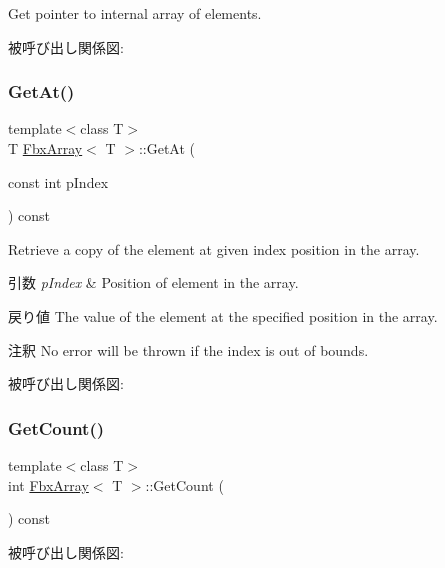 Get pointer to internal array of elements. 

被呼び出し関係図\+:
\mbox{\label{class_fbx_array_a868a1b5f4ee06544665040c08d1dd3ce}} 
\subsubsection{\texorpdfstring{Get\+At()}{GetAt()}}
{\footnotesize\ttfamily template$<$class T$>$ \\
T \hyperlink{class_fbx_array}{Fbx\+Array}$<$ T $>$\+::Get\+At (\begin{DoxyParamCaption}\item[{const int}]{p\+Index }\end{DoxyParamCaption}) const}

Retrieve a copy of the element at given index position in the array. 
\begin{DoxyParams}{引数}
{\em p\+Index} & Position of element in the array. \\
\hline
\end{DoxyParams}
\begin{DoxyReturn}{戻り値}
The value of the element at the specified position in the array. 
\end{DoxyReturn}
\begin{DoxyRemark}{注釈}
No error will be thrown if the index is out of bounds. 
\end{DoxyRemark}
被呼び出し関係図\+:
\mbox{\label{class_fbx_array_a7a47b85464e00634fb9fce26409c7d2a}} 
\subsubsection{\texorpdfstring{Get\+Count()}{GetCount()}}
{\footnotesize\ttfamily template$<$class T$>$ \\
int \hyperlink{class_fbx_array}{Fbx\+Array}$<$ T $>$\+::Get\+Count (\begin{DoxyParamCaption}{ }\end{DoxyParamCaption}) const}

被呼び出し関係図\+:
\mbox{\label{class_fbx_array_a913fc7ea982235d344c572f47367b96c}} 
